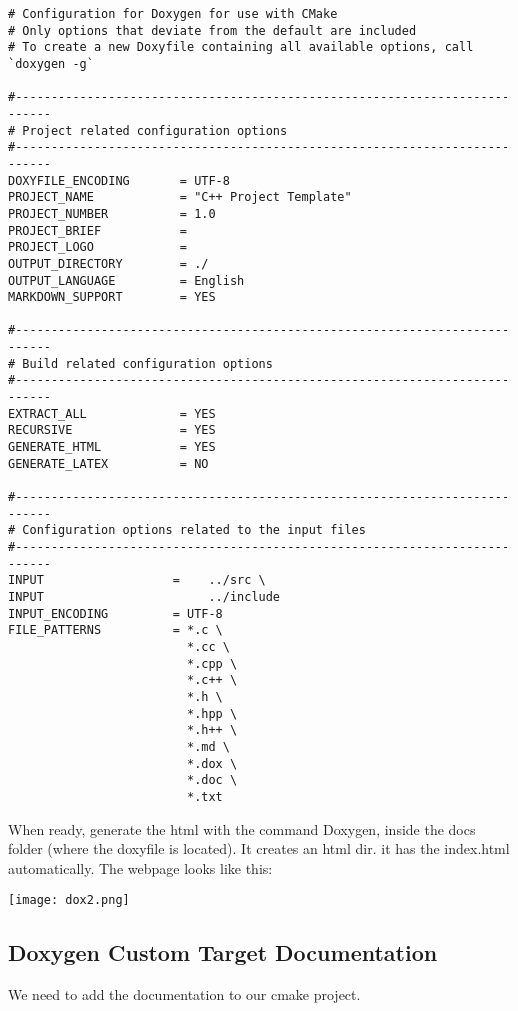 \documentclass[openany]{report}
\begin{document}
\begin{verbatim}
# Configuration for Doxygen for use with CMake
# Only options that deviate from the default are included
# To create a new Doxyfile containing all available options, call `doxygen -g`

#---------------------------------------------------------------------------
# Project related configuration options
#---------------------------------------------------------------------------
DOXYFILE_ENCODING       = UTF-8
PROJECT_NAME            = "C++ Project Template"
PROJECT_NUMBER          = 1.0
PROJECT_BRIEF           =
PROJECT_LOGO            =
OUTPUT_DIRECTORY        = ./
OUTPUT_LANGUAGE         = English
MARKDOWN_SUPPORT        = YES

#---------------------------------------------------------------------------
# Build related configuration options
#---------------------------------------------------------------------------
EXTRACT_ALL             = YES
RECURSIVE               = YES
GENERATE_HTML           = YES
GENERATE_LATEX          = NO

#---------------------------------------------------------------------------
# Configuration options related to the input files
#---------------------------------------------------------------------------
INPUT                  =    ../src \
INPUT                       ../include
INPUT_ENCODING         = UTF-8
FILE_PATTERNS          = *.c \
                         *.cc \
                         *.cpp \
                         *.c++ \
                         *.h \
                         *.hpp \
                         *.h++ \
                         *.md \
                         *.dox \
                         *.doc \
                         *.txt
\end{verbatim}

When ready, generate the html with the command Doxygen, inside the docs folder (where the doxyfile is located). It creates an html dir.
it has the index.html automatically. The webpage looks like this:


\begin{center}
    \texttt{[image: dox2.png]}
\end{center}


\subsection{Doxygen Custom Target Documentation}

We need to add the documentation to our cmake project.
\end{document}
